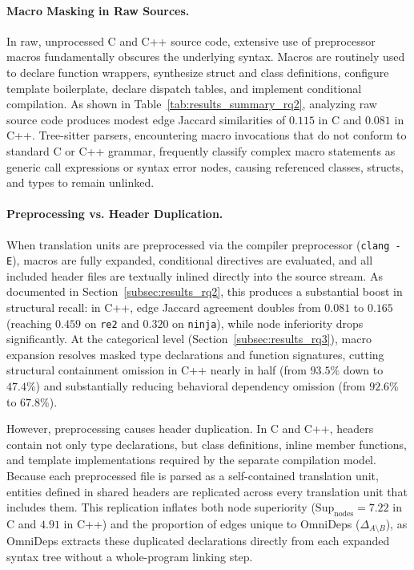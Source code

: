 \paragraph{Macro Masking in Raw Sources.}
In raw, unprocessed C and C++ source code, extensive use of preprocessor
macros fundamentally obscures the underlying syntax. Macros are routinely used
to declare function wrappers, synthesize struct and class definitions, configure
template boilerplate, declare dispatch tables, and implement conditional
compilation. As shown in Table~\ref{tab:results_summary_rq2}, analyzing raw
source code produces modest edge Jaccard similarities of $0.115$ in C and
$0.081$ in C++. Tree-sitter parsers, encountering macro invocations that do not
conform to standard C or C++ grammar, frequently classify complex macro
statements as generic call expressions or syntax error nodes, causing
referenced classes, structs, and types to remain unlinked.

\paragraph{Preprocessing vs. Header Duplication.}
When translation units are preprocessed via the compiler preprocessor
(\texttt{clang -E}), macros are fully expanded, conditional directives are
evaluated, and all included header files are textually inlined directly into the
source stream. As documented in Section~\ref{subsec:results_rq2}, this produces
a substantial boost in structural recall: in C++, edge Jaccard agreement
doubles from $0.081$ to $0.165$ (reaching $0.459$ on \texttt{re2} and $0.320$
on \texttt{ninja}), while node inferiority drops significantly. At the
categorical level (Section~\ref{subsec:results_rq3}), macro expansion resolves
masked type declarations and function signatures, cutting structural
containment omission in C++ nearly in half (from $93.5\%$ down to $47.4\%$) and
substantially reducing behavioral dependency omission (from $92.6\%$ to
$67.8\%$).

However, preprocessing causes header duplication. In C and C++, headers contain
not only type declarations, but class definitions, inline member functions, and
template implementations required by the separate compilation model. Because
each preprocessed file is parsed as a self-contained translation unit, entities
defined in shared headers are replicated across every translation unit that
includes them. This replication inflates both node superiority
($\text{Sup}_{\text{nodes}} = 7.22$ in C and $4.91$ in C++) and the proportion
of edges unique to OmniDeps ($\Delta_{A \setminus B}$), as OmniDeps extracts
these duplicated declarations directly from each expanded syntax tree without a
whole-program linking step.

